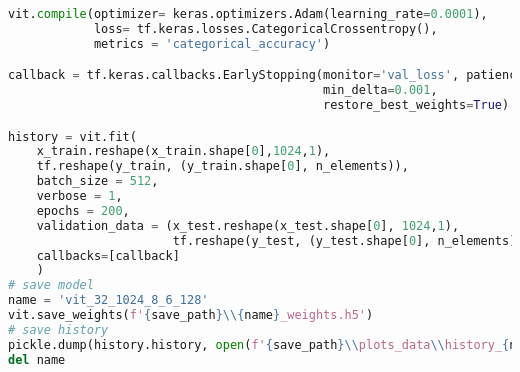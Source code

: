 \begin{lstlisting}[language=Python]
vit.compile(optimizer= keras.optimizers.Adam(learning_rate=0.0001),
            loss= tf.keras.losses.CategoricalCrossentropy(),
            metrics = 'categorical_accuracy')

callback = tf.keras.callbacks.EarlyStopping(monitor='val_loss', patience=10,
                                            min_delta=0.001,
                                            restore_best_weights=True)

history = vit.fit(
    x_train.reshape(x_train.shape[0],1024,1),
    tf.reshape(y_train, (y_train.shape[0], n_elements)),
    batch_size = 512,
    verbose = 1,
    epochs = 200,
    validation_data = (x_test.reshape(x_test.shape[0], 1024,1),
                       tf.reshape(y_test, (y_test.shape[0], n_elements))),
    callbacks=[callback]
    )
# save model
name = 'vit_32_1024_8_6_128'
vit.save_weights(f'{save_path}\\{name}_weights.h5')
# save history
pickle.dump(history.history, open(f'{save_path}\\plots_data\\history_{name}.pkl', 'wb'))
del name
\end{lstlisting}

